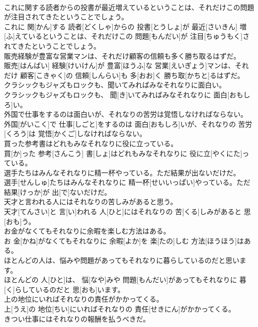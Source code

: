 \documentclass[8pt]{extreport}
\begin{document}
\begin{CJK}{UTF8}{min}
\\	これに関する読者からの投書が最近増えているということは、それだけこの問題が注目されてきたということでしょう。	
\\	これに 関[かん]する 読者[どくしゃ]からの 投書[とうしょ]が 最近[さいきん] 増[ふ]えているということは、それだけこの 問題[もんだい]が 注目[ちゅうもく]されてきたということでしょう。
\\	販売経験が豊富な営業マンは、それだけ顧客の信頼も多く勝ち取るはずだ。	
\\	販売[はんばい] 経験[けいけん]が 豊富[ほうふ]な 営業[えいぎょう]マンは、それだけ 顧客[こきゃく]の 信頼[しんらい]も 多[おお]く 勝ち取[かちと]るはずだ。
\\	クラシックもジャズもロックも、聞いてみればみなそれなりに面白い。	
\\	クラシックもジャズもロックも、 聞[き]いてみればみなそれなりに 面白[おもしろ]い。
\\	外国で仕事をするのは面白いが、それなりの苦労は覚悟しなければならない。	
\\	外国[がいこく]で 仕事[しごと]をするのは 面白[おもしろ]いが、それなりの 苦労[くろう]は 覚悟[かくご]しなければならない。
\\	買った参考書はどれもみなそれなりに役に立っている。	
\\	買[か]った 参考[さんこう] 書[しょ]はどれもみなそれなりに 役に立[やくにた]っている。
\\	選手たちはみんなそれなりに精一杯やっている。ただ結果が出ないだけだ。	
\\	選手[せんしゅ]たちはみんなそれなりに 精一杯[せいいっぱい]やっている。ただ 結果[けっか]が 出[で]ないだけだ。
\\	天才と言われる人にはそれなりの苦しみがあると思う。	
\\	天才[てんさい]と 言[い]われる 人[ひと]にはそれなりの 苦[くる]しみがあると 思[おも]う。
\\	お金がなくてもそれなりに余暇を楽しむ方法はある。	
\\	お 金[かね]がなくてもそれなりに 余暇[よか]を 楽[たの]しむ 方法[ほうほう]はある。
\\	ほとんどの人は、悩みや問題があってもそれなりに暮らしているのだと思います。	
\\	ほとんどの 人[ひと]は、 悩[なや]みや 問題[もんだい]があってもそれなりに 暮[く]らしているのだと 思[おも]います。
\\	上の地位にいればそれなりの責任がかかってくる。	
\\	上[うえ]の 地位[ちい]にいればそれなりの 責任[せきにん]がかかってくる。
\\	きつい仕事にはそれなりの報酬を払うべきだ。	

\end{CJK}
\end{document}
